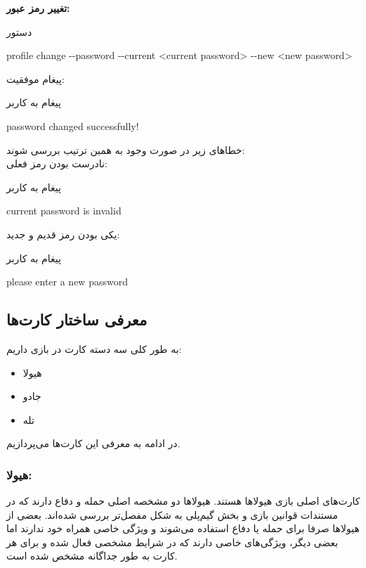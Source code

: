 \documentclass[]{article}
\begin{document}
\vspace{.5cm}
\textbf{تغییر رمز عبور:}
\begin{mybox}[colback=yellow]{دستور}
	\begin{latin}	
		profile change -{}-password -{}-current <current password> -{}-new <new 
		password>
	\end{latin}
\end{mybox}
پیغام موفقیت:
\begin{mybox}[colback=yellow]{پیغام به کاربر}
	\begin{latin}	
		password changed successfully!
	\end{latin}
\end{mybox}
خطا‌های زیر در صورت وجود به همین ترتیب بررسی شوند:
\\
نادرست بودن رمز فعلی:
\begin{mybox}[colback=yellow]{پیغام به کاربر}
	\begin{latin}	
		current password is invalid
	\end{latin}
\end{mybox}
یکی بودن رمز قدیم و جدید:
\begin{mybox}[colback=yellow]{پیغام به کاربر}
	\begin{latin}	
		please enter a new password
	\end{latin}
\end{mybox}

\subsection*{{\titr معرفی ساختار کارت‌ها}}

به طور کلی سه دسته کارت در بازی داریم:
\begin{itemize}
	\item
	هیولا
	\item
	جادو
	
	\item
	تله
\end{itemize}

در ادامه به معرفی این کارت‌ها می‌پردازیم.

\subsubsection*{{\titr هیولا:}}
کارت‌های اصلی بازی هیولاها هستند. هیولاها دو مشخصه اصلی حمله و دفاع دارند که در مستندات قوانین بازی و بخش گیم‌پلی به شکل مفصل‌تر بررسی شده‌اند. بعضی از هیولاها صرفا برای حمله یا دفاع استفاده می‌شوند و ویژگی خاصی همراه خود ندارند اما بعضی دیگر، ویژگی‌های خاصی دارند که در شرایط مشخصی فعال شده و برای هر کارت به طور جداگانه مشخص شده است.
\end{document}
